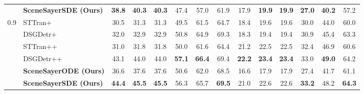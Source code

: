 \begin{table}[!h]
{\begin{tabular}{ll|cccccc|cccccc}
        &        \textbf{SceneSayerSDE (Ours)} & \cellcolor{highlightColor} \textbf{38.8} & \cellcolor{highlightColor} \textbf{40.3} & \cellcolor{highlightColor} \textbf{40.3} & 47.4 & 57.0 & 61.9 & 17.9 & \cellcolor{highlightColor} \textbf{19.9} & \cellcolor{highlightColor} \textbf{19.9} & \cellcolor{highlightColor} \textbf{27.0} & \cellcolor{highlightColor} \textbf{40.2} & 57.2  \\ 
          \cmidrule(lr){2-7} \cmidrule(lr){8-13} 
        \multirow{6}{*}{0.9} &        STTran+ \cite{cong_et_al_sttran_2021} & 30.5 & 31.3 & 31.3 & 49.5 & 61.5 & 64.7 & 18.4 & 19.6 & 19.6 & 30.0 & 44.0 & 60.0  \\ 
        &        DSGDetr+ \cite{Feng_2021} & 32.0 & 32.9 & 32.9 & 50.8 & 64.9 & 69.3 & 18.3 & 19.4 & 19.4 & 30.9 & 45.4 & 63.3  \\ 
        &        STTran++ \cite{cong_et_al_sttran_2021} & 31.0 & 31.8 & 31.8 & 50.0 & 61.6 & 64.4 & 21.2 & 22.5 & 22.5 & 32.4 & 46.9 & 60.6  \\ 
        &        DSGDetr++ \cite{Feng_2021} & 43.1 & 44.0 & 44.0 & \cellcolor{highlightColor} \textbf{57.1} & \cellcolor{highlightColor} \textbf{66.4} & 69.4 & \cellcolor{highlightColor} \textbf{22.2} & \cellcolor{highlightColor} \textbf{23.4} & \cellcolor{highlightColor} \textbf{23.4} & 33.0 & \cellcolor{highlightColor} \textbf{49.0} & 64.2  \\ 
        &        \textbf{SceneSayerODE (Ours)} & 36.6 & 37.6 & 37.6 & 50.6 & 62.0 & 68.5 & 16.6 & 17.9 & 17.9 & 27.4 & 41.7 & 61.1  \\ 
        &        \textbf{SceneSayerSDE (Ours)} & \cellcolor{highlightColor} \textbf{44.4} & \cellcolor{highlightColor} \textbf{45.5} & \cellcolor{highlightColor} \textbf{45.5} & 56.3 & 65.7 & \cellcolor{highlightColor} \textbf{69.5} & 21.0 & 22.6 & 22.6 & \cellcolor{highlightColor} \textbf{33.2} & 48.2 & \cellcolor{highlightColor} \textbf{64.3}  \\ 
          \hline 
    \end{tabular}
    }
\end{table}
